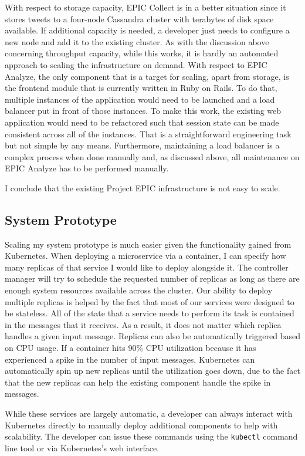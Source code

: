 With respect to storage capacity, EPIC Collect is in a better situation since it stores tweets to a four-node Cassandra cluster with terabytes of disk space available. If additional capacity is needed, a developer just needs to configure a new node and add it to the existing cluster. As with the discussion above concerning throughput capacity, while this works, it is hardly an automated approach to scaling the infrastructure on demand.
With respect to EPIC Analyze, the only component that is a target for scaling, apart from storage, is the frontend module that is currently written in Ruby on Rails. To do that, multiple instances of the application would need to be launched and a load balancer put in front of those instances. To make this work, the existing web application would need to be refactored such that session state can be made consistent across all of the instances. That is a straightforward engineering task but not simple by any means. Furthermore, maintaining a load balancer is a complex process when done manually and, as discussed above, all maintenance on EPIC Analyze has to be performed manually.

I conclude that the existing Project EPIC infrastructure is not easy to scale.

\subsection{System Prototype}

Scaling my system prototype is much easier given the functionality gained from Kubernetes. When deploying a microservice via a container, I can specify how many replicas of that service I would like to deploy alongside it. The controller manager will try to schedule the requested number of replicas as long as there are enough system resources available across the cluster. Our ability to deploy multiple replicas is helped by the fact that most of our services were designed to be stateless. All of the state that a service needs to perform its task is contained in the messages that it receives. As a result, it does not matter which replica handles a given input message. Replicas can also be automatically triggered based on CPU usage. If a container hits 90\% CPU utilization because it has experienced a spike in the number of input messages, Kubernetes can automatically spin up new replicas until the utilization goes down, due to the fact that the new replicas can help the existing component handle the spike in messages.

While these services are largely automatic, a developer can always interact with Kubernetes directly to manually deploy additional components to help with scalability. The developer can issue these commands using the \texttt{kubectl} command line tool or via Kubernetes’s web interface.

